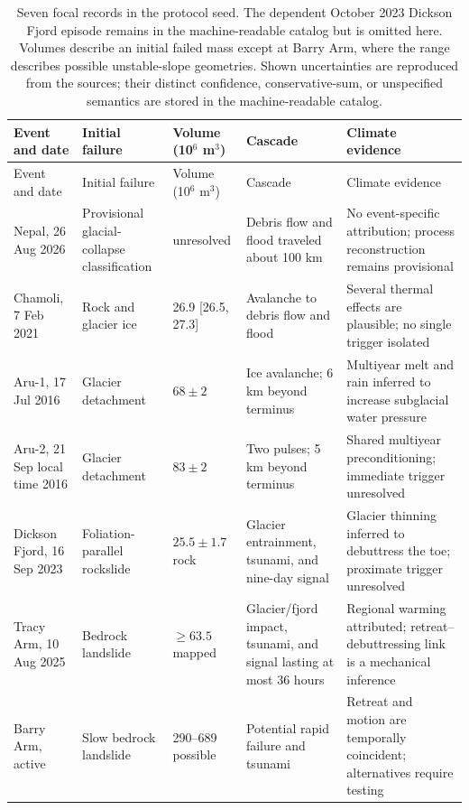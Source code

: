 \documentclass[11pt]{article}
\begin{document}
\begin{longtable}{@{}P{0.15\textwidth}P{0.16\textwidth}P{0.12\textwidth}P{0.23\textwidth}P{0.22\textwidth}@{}}
\caption{Seven focal records in the protocol seed. The dependent October 2023
Dickson Fjord episode remains in the machine-readable catalog but is omitted
here. Volumes describe an initial failed mass except at Barry Arm, where the
range describes possible unstable-slope geometries. Shown uncertainties are
reproduced from the sources; their distinct confidence, conservative-sum,
or unspecified semantics are stored in the machine-readable catalog.}\label{tab:events}\\
\toprule
Event and date & Initial failure & Volume (10$^6$ m$^3$) & Cascade & Climate evidence \\
\midrule
\endfirsthead
\toprule
Event and date & Initial failure & Volume (10$^6$ m$^3$) & Cascade & Climate evidence \\
\midrule
\endhead
Nepal, 26 Aug 2026 & Provisional glacial-collapse classification & unresolved & Debris flow and flood traveled about 100 km & No event-specific attribution; process reconstruction remains provisional \citep{USGS2026Nepal,USGS2026NepalSeismic} \\
Chamoli, 7 Feb 2021 & Rock and glacier ice & 26.9 [26.5, 27.3] & Avalanche to debris flow and flood & Several thermal effects are plausible; no single trigger isolated \citep{Shugar2021,VanWykDeVries2022} \\
Aru-1, 17 Jul 2016 & Glacier detachment & $68\pm2$ & Ice avalanche; 6 km beyond terminus & Multiyear melt and rain inferred to increase subglacial water pressure \citep{Gilbert2018} \\
Aru-2, 21 Sep local time 2016 & Glacier detachment & $83\pm2$ & Two pulses; 5 km beyond terminus & Shared multiyear preconditioning; immediate trigger unresolved \citep{Kaab2018,Gilbert2018} \\
Dickson Fjord, 16 Sep 2023 & Foliation-parallel rockslide & $25.5\pm1.7$ rock & Glacier entrainment, tsunami, and nine-day signal & Glacier thinning inferred to debuttress the toe; proximate trigger unresolved \citep{Svennevig2024} \\
Tracy Arm, 10 Aug 2025 & Bedrock landslide & $\geq63.5$ mapped & Glacier/fjord impact, tsunami, and signal lasting at most 36 hours & Regional warming attributed; retreat--debuttressing link is a mechanical inference \citep{Shugar2026} \\
Barry Arm, active & Slow bedrock landslide & 290--689 possible & Potential rapid failure and tsunami & Retreat and motion are temporally coincident; alternatives require testing \citep{Dai2020,Barnhart2021} \\
\bottomrule
\end{longtable}
\end{document}
